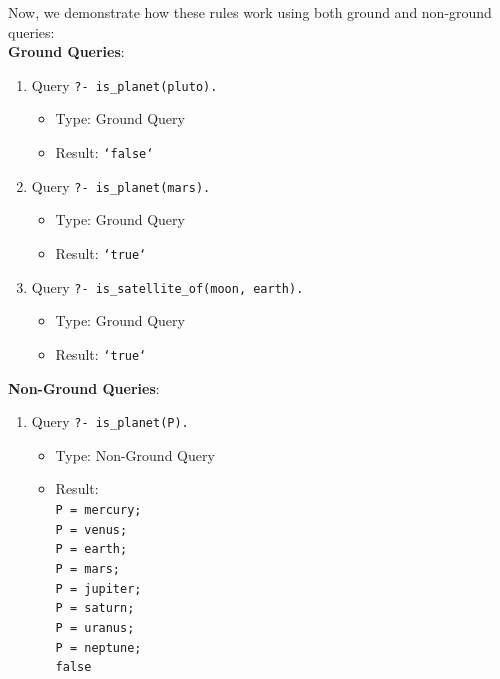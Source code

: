 \documentclass[12pt]{article}
\begin{document}
\begin{spacing}{1.5}
\begin{enumerate}
		      Now, we demonstrate how these rules work using both ground and non-ground queries:\\

		      \textbf{Ground Queries}:

		      \begin{enumerate}
		      	\item 
		      	      Query \texttt{?- is\_planet(pluto).}
		      	      \begin{itemize}
		      	      	\item Type: Ground Query
		      	      	\item Result: \texttt{`false`}
		      	      \end{itemize}
		      	           
		      	\item 
		      	      Query \texttt{?- is\_planet(mars).}
		      	      \begin{itemize}
		      	      	\item Type: Ground Query
		      	      	\item Result: \texttt{`true`}
		      	      \end{itemize}
		      	           
		      	\item 
		      	      Query \texttt{?- is\_satellite\_of(moon, earth).}
		      	      \begin{itemize}
		      	      	\item Type: Ground Query
		      	      	\item Result: \texttt{`true`}\\
		      	      \end{itemize}
		      \end{enumerate}

		      \textbf{Non-Ground Queries}:
		      \begin{enumerate}
		      	 	
		      	\item 
		      	      Query \texttt{?- is\_planet(P).}
		      	      \begin{itemize}
		      	      	\item Type: Non-Ground Query
		      	      	\item Result: \texttt{\\
		      	      		P = mercury;\\
		      	      		P = venus;\\
		      	      		P = earth;\\
		      	      		P = mars;\\
		      	      		P = jupiter;\\
		      	      		P = saturn;\\
		      	      		P = uranus;\\
		      	      		P = neptune;\\
		      	      	false}
		      	      \end{itemize}
		      	           

\end{enumerate}
\end{enumerate}
\end{spacing}
\end{document}
